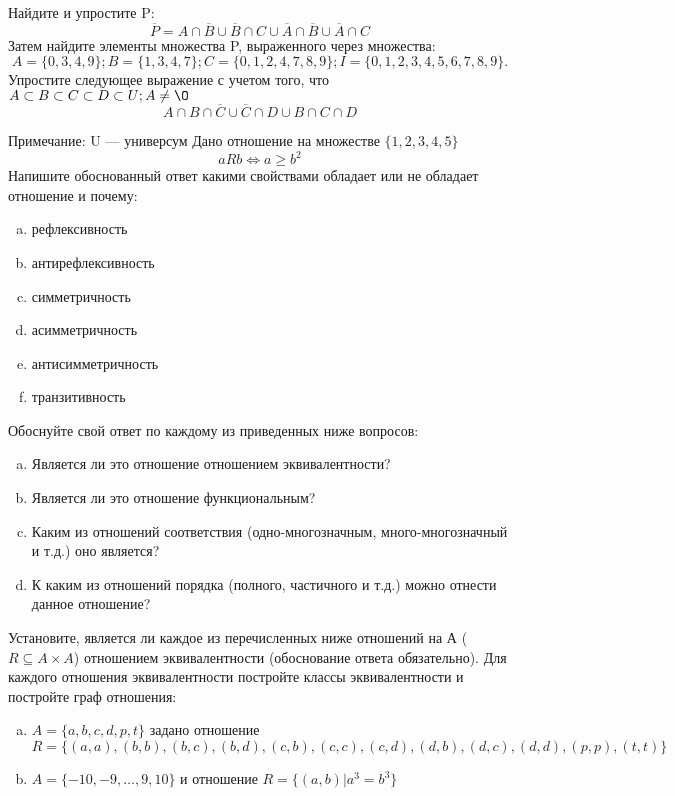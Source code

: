 \documentclass[10pt]{exam}
\begin{document}
\begin{questions}
\question
Найдите и упростите P:
\begin{equation*}
\overline{P} = A \cap \overline{B} \cup \overline{B} \cap C \cup \overline{A} \cap \overline{B} \cup \overline{A} \cap C
\end{equation*}
Затем найдите элементы множества P, выраженного через множества:
\begin{equation*}
A = \{0, 3, 4, 9\}; 
B = \{1, 3, 4, 7\};
C = \{0, 1, 2, 4, 7, 8, 9\};
I = \{0, 1, 2, 3, 4, 5, 6, 7, 8, 9\}.
\end{equation*}\question
Упростите следующее выражение с учетом того, что $A\subset B \subset C \subset D \subset U; A \neq \O$
\begin{equation*}
A \cap B  \cap \overline{C} \cup \overline{C} \cap D \cup B \cap C \cap D
\end{equation*}

Примечание: U — универсум\question
Дано отношение на множестве $\{1, 2, 3, 4, 5\}$ 
\begin{equation*}
aRb \iff a \geq b^2
\end{equation*}
Напишите обоснованный ответ какими свойствами обладает или не обладает отношение и почему:   
\begin{enumerate} [a)]\setcounter{enumi}{0}
\item рефлексивность
\item антирефлексивность
\item симметричность
\item асимметричность
\item антисимметричность
\item транзитивность
\end{enumerate}

Обоснуйте свой ответ по каждому из приведенных ниже вопросов:
\begin{enumerate} [a)]\setcounter{enumi}{0}
    \item Является ли это отношение отношением эквивалентности?
    \item Является ли это отношение функциональным?
    \item Каким из отношений соответствия (одно-многозначным, много-многозначный и т.д.) оно является?
    \item К каким из отношений порядка (полного, частичного и т.д.) можно отнести данное отношение?
\end{enumerate}


\question
Установите, является ли каждое из перечисленных ниже отношений на А ($R \subseteq A \times A$) отношением эквивалентности (обоснование ответа обязательно). Для каждого отношения эквивалентности постройте классы 
эквивалентности и постройте граф отношения:
\begin{enumerate} [a)]\setcounter{enumi}{0}
\item $A = \{a, b, c, d, p, t\}$ задано отношение $R = \{(a, a), (b, b), (b, c), (b, d), (c, b), (c, c), (c, d), (d, b), (d, c), (d, d), (p,p), (t,t)\}$
\item $A = \{-10, -9, … , 9, 10\}$ и отношение $R = \{(a,b)|a^{3} = b^{3}\}$


\end{enumerate}
\end{questions}
\end{document}
